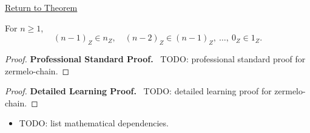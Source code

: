 \newpage
{}
\label{prf:zermelo-chain}

\begin{remark*}[Return]
\hyperref[cor:zermelo-chain]{Return to Theorem}
\end{remark*}

\begin{theorem*}
For $n\ge 1$,
\[
(n-1)_Z \in n_Z,\quad (n-2)_Z \in (n-1)_Z,\ \dots,\ 0_Z \in 1_Z.
\]
\end{theorem*}

\begin{proof}
\textbf{Professional Standard Proof.}~
TODO: professional standard proof for zermelo-chain.
\end{proof}

\begin{proof}
\textbf{Detailed Learning Proof.}~
TODO: detailed learning proof for zermelo-chain.
\end{proof}

\begin{remark*}
\end{remark*}

\begin{dependencies}
\begin{itemize}
  \item TODO: list mathematical dependencies.
\end{itemize}
\end{dependencies}

\clearpage
